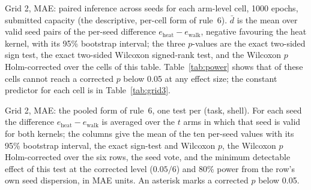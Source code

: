 \documentclass[preprint,11pt,3p]{elsarticle}
\begin{document}
\begin{table}[htbp]
\centering
\caption{Grid 2, MAE: paired inference across seeds for each arm-level cell, 1000 epochs,
submitted capacity (the descriptive, per-cell form of rule~6). $\bar d$ is the mean over valid
seed pairs of the per-seed difference $e_{\mathrm{heat}}-e_{\mathrm{walk}}$, negative favouring
the heat kernel, with its 95\% bootstrap interval; the three $p$-values are the exact two-sided
sign test, the exact two-sided Wilcoxon signed-rank test, and the Wilcoxon $p$ Holm-corrected
over the \numGthreeArmCells{} cells of this table. Table~\ref{tab:power} shows that
\numPowerCannotReject{} of these cells cannot reach a corrected $p$ below 0.05 at any effect
size; the constant predictor for each cell is in Table~\ref{tab:grid3}.}
\label{tab:grid3inf}

\end{table}

\begin{table}[htbp]
\centering
\caption{Grid 2, MAE: the pooled form of rule~6, one test per (task, shell). For each seed the
difference $e_{\mathrm{heat}}-e_{\mathrm{walk}}$ is averaged over the $t$ arms in which that seed
is valid for both kernels; the columns give the mean of the ten per-seed values with its 95\%
bootstrap interval, the exact sign-test and Wilcoxon $p$, the Wilcoxon $p$ Holm-corrected over
the six rows, the seed vote, and the minimum detectable effect of this test at the corrected
level ($0.05/6$) and 80\% power from the row's own seed dispersion, in MAE units. An asterisk
marks a corrected $p$ below 0.05.}
\label{tab:pooled}

\end{table}
\end{document}
